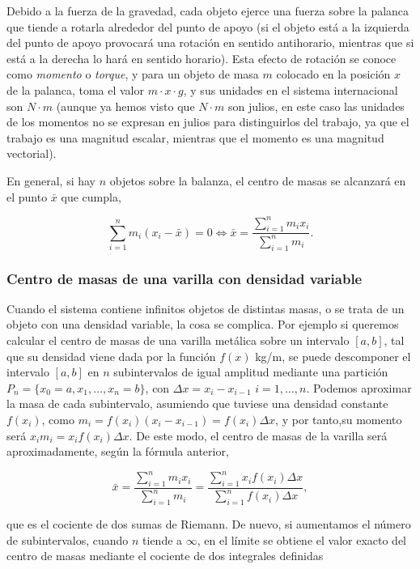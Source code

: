 \documentclass[
  a4paper,
]{scrreport}
\theoremstyle{definition}
\theoremstyle{definition}
\theoremstyle{definition}
\theoremstyle{plain}
\theoremstyle{plain}
\theoremstyle{plain}
\theoremstyle{remark}
\begin{document}
Debido a la fuerza de la gravedad, cada objeto ejerce una fuerza sobre
la palanca que tiende a rotarla alrededor del punto de apoyo (si el
objeto está a la izquierda del punto de apoyo provocará una rotación en
sentido antihorario, mientras que si está a la derecha lo hará en
sentido horario). Esta efecto de rotación se conoce como \emph{momento}
o \emph{torque}, y para un objeto de masa \(m\) colocado en la posición
\(x\) de la palanca, toma el valor \(m\cdot x\cdot g\), y sus unidades
en el sistema internacional son \(N\cdot m\) (aunque ya hemos visto que
\(N\cdot m\) son julios, en este caso las unidades de los momentos no se
expresan en julios para distinguirlos del trabajo, ya que el trabajo es
una magnitud escalar, mientras que el momento es una magnitud
vectorial).

En general, si hay \(n\) objetos sobre la balanza, el centro de masas se
alcanzará en el punto \(\bar x\) que cumpla,

\[
\sum_{i=1}^n m_i(x_i-\bar x) = 0 \Leftrightarrow \bar x = \frac{\sum_{i=1}^n m_ix_i}{\sum_{i=1}^n m_i}.
\]

\subsubsection{Centro de masas de una varilla con densidad
variable}\label{centro-de-masas-de-una-varilla-con-densidad-variable}

Cuando el sistema contiene infinitos objetos de distintas masas, o se
trata de un objeto con una densidad variable, la cosa se complica. Por
ejemplo si queremos calcular el centro de masas de una varilla metálica
sobre un intervalo \([a,b]\), tal que su densidad viene dada por la
función \(f(x)\) kg/m, se puede descomponer el intervalo \([a,b]\) en
\(n\) subintervalos de igual amplitud mediante una partición
\(P_n=\{x_0=a, x_1, \ldots, x_n=b\}\), con \(\Delta x=x_i-x_{i-1}\)
\(i=1, \ldots, n\). Podemos aproximar la masa de cada subintervalo,
asumiendo que tuviese una densidad constante \(f(x_i)\), como
\(m_i = f(x_i)(x_i-x_{i-1}) = f(x_i) \Delta x\), y por tanto,su momento
será \(x_im_i = x_i f(x_i)\Delta x\). De este modo, el centro de masas
de la varilla será aproximadamente, según la fórmula anterior,

\[
\bar x = \frac{\sum_{i=1}^n m_ix_i}{\sum_{i=1}^n m_i} = \frac{\sum_{i=1}^n x_if(x_i)\Delta x}{\sum_{i=1}^n f(x_i)\Delta x},
\]

que es el cociente de dos sumas de Riemann. De nuevo, si aumentamos el
número de subintervalos, cuando \(n\) tiende a \(\infty\), en el límite
se obtiene el valor exacto del centro de masas mediante el cociente de
dos integrales definidas
\end{document}
